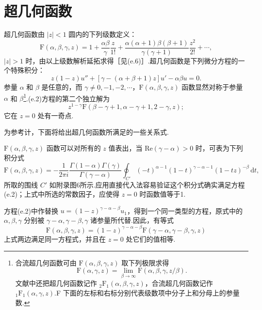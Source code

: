 \section{超几何函数}

超几何函数由 $|z|<1$ 圆内的下列级数定义：
\begin{equation}
  \mathrm{F}(\alpha,\beta,\gamma,z)=1+\frac{\alpha\beta}{\gamma}\frac{z}{1!}
  +\frac{\alpha(\alpha+1)\beta(\beta+1)}{\gamma(\gamma+1)}\frac{z^2}{2!}+\cdots,
\end{equation}
$|z|>1$ 时，由以上级数解析延拓求得［见(e.6)］.超几何函数是下列微分方程的一个特殊积分：
\begin{equation}
  z(1-z)u''+\left[\gamma-(\alpha+\beta+1)z\right]u'-\alpha\beta u=0.
\end{equation}
参量 $\alpha$ 和 $\beta$ 是任意的，而 $\gamma\neq 0,-1,-2,\cdots$，$\mathrm{F}(\alpha,\beta,\gamma,z)$ 函数显然对称于参量 $\alpha$ 和 $\beta$\footnote{合流超几何函数可由 $\mathrm{F}(\alpha,\beta,\gamma,z)$ 取下列极限求得
\begin{equation*}
  \mathrm{F}(\alpha,\gamma,z)=\lim_{\beta\to\infty}\mathrm{F}(\alpha,\beta,\gamma,z/\beta).
\end{equation*}
文献中还把超几何函数记作 $_2\mathrm{F}_1(\alpha,\beta,\gamma,z)$，合流超几何函数记作 $_1\mathrm{F}_1(\alpha,\gamma,z)$.F 下面的左标和右标分别代表级数项中分子上和分母上的参量数.}.(e.2)方程的第二个独立解为
\begin{equation*}
  z^{1-\gamma}\mathrm{F}(\beta-\gamma+1,\alpha-\gamma+1,2-\gamma,z);
\end{equation*}
它在 $z=0$ 处有一奇点.

为参考计，下面将给出超几何函数所满足的一些关系式.

$\mathrm{F}(\alpha,\beta,\gamma,z)$ 函数可以对所有的 $z$ 值表出，当 $\mathrm{Re}(\gamma-\alpha)>0$ 时，可表为下列积分式
\begin{equation}
  \mathrm{F}(\alpha,\beta,\gamma,z)=-\frac{1}{2\pi i}
  \frac{\Gamma(1-\alpha)\Gamma(\gamma)}{\Gamma(\gamma-\alpha)}
  \oint_{C'}(-t)^{\alpha-1}(1-t)^{\gamma-\alpha-1}(1-tz)^{-\beta}\,\mathrm{d}t,
\end{equation}
所取的围线 $C'$ 如附录图6所示.应用直接代入法容易验证这个积分式确实满足方程(e.2)；上式中所选的常数因子，应使得 $z=0$ 时函数值等于1.

方程(e.2)中作替换 $u=(1-z)^{\gamma-\alpha-\beta}u_1$，得到一个同一类型的方程，原式中的 $\alpha,\beta,\gamma$ 分别被 $\gamma-\alpha,\gamma-\beta,\gamma$ 诸参量所代替.因此，有等式
\begin{equation}
  \mathrm{F}(\alpha,\beta,\gamma,z)=(1-z)^{\gamma-\alpha-\beta}
  \mathrm{F}(\gamma-\alpha,\gamma-\beta,\gamma,z)
\end{equation}
上式两边满足同一方程式，并且在 $z=0$ 处它们的值相等.

